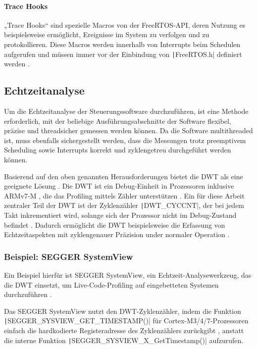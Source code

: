 \paragraph{Trace Hooks}

„Trace Hooks“ sind spezielle Macros von der FreeRTOS-API, deren Nutzung es
beispielsweise ermöglicht, Ereignisse im System zu verfolgen und zu
protokollieren. Diese Macros werden innerhalb von Interrupts beim Schedulen
aufgerufen und müssen immer vor der Einbindung von \texttt|FreeRTOS.h|
definiert werden \cite{freertos_rtos_trace_hooks}.

\subsection{Echtzeitanalyse}

Um die Echtzeitanalyse der Steuerungssoftware durchzuführen, ist eine Methode
erforderlich, mit der beliebige Ausführungsabschnitte der Software flexibel,
präzise und threadsicher gemessen werden können. Da die Software multithreaded
ist, muss ebenfalls sichergestellt werden, dass die Messungen trotz preemptivem
Scheduling sowie Interrupts korrekt und zyklengetreu durchgeführt werden können.

Basierend auf den oben genannten Herausforderungen bietet die \ac{DWT} als eine
geeignete Lösung \cite{ARM_KA001499}. Die DWT ist ein Debug-Einheit in
Prozessoren inklusive ARMv7-M \cite{ARMv7_ref_man_dwt_about}, die das Profiling
mittels Zähler unterstützen \cite{ARMv7_ref_man_dwt_profiling}. Ein für diese
Arbeit zentraler Teil der DWT ist der Zyklenzähler \texttt|DWT_CYCCNT|,
der bei jedem Takt inkrementiert wird, solange sich der Prozessor nicht im
Debug-Zustand befindet \cite{ARMv7_ref_man_dwt_cycle}. Dadurch ermöglicht die
DWT beispielsweise die Erfassung von Echtzeitaspekten mit zyklengenauer
Präzision under normaler Operation \cite{ARMv7_ref_man_dwt}.

\subsubsection{Beispiel: SEGGER SystemView}

Ein Beispiel hierfür ist SEGGER SystemView, ein Echtzeit-Analysewerkzeug, das
die DWT einsetzt, um Live-Code-Profiling auf eingebetteten Systemen
durchzuführen \cite{SEGGER_SystemView}.

Das SEGGER SystemView nutzt den DWT-Zyklenzähler, indem die Funktion \linebreak
\texttt|SEGGER_SYSVIEW_GET_TIMESTAMP()| für Cortex-M3/4/7-Prozessoren
einfach die hardkodierte Registeradresse des Zyklenzählers zurückgibt \cite[S.
65]{Segger_SystemView_manual}\cite{Arm_DWT_Programmers_Model}, anstatt die
interne Funktion \texttt|SEGGER_SYSVIEW_X_GetTimestamp()| aufzurufen.


